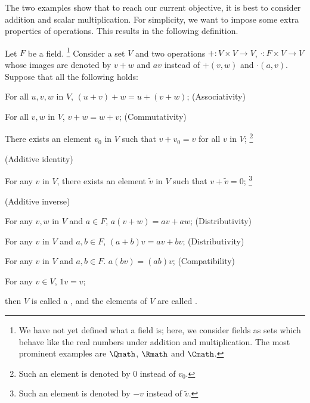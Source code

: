 The two examples show that
to reach our current objective,
it is best to consider addition and scalar multiplication.
For simplicity, we want to impose some extra properties of operations.
This results in the following definition.

\begin{definition}
    \label{def:vectorspace}
    Let \(F\) be a field.%
    \footnote{We have not yet defined what a field is;
    here, we consider fields as sets which behave like the real numbers
    under addition and multiplication.
    The most prominent examples are
    \(\Qmath\), \(\Rmath\) and \(\Cmath\).}
    Consider a set \(V\) and two operations
    \(+:V\times V\to V\), \(\cdot:F\times V\to V\)
    whose images are denoted by \(v+w\) and \(av\)
    instead of \(+(v,w)\) and \(\cdot(a,v)\).
    Suppose that all the following holds:
    \begin{axioms}[Vsp]
        \item For all \(u,v,w\) in \(V\), \((u+v)+w=u+(v+w)\);
        \hfill\textsf{(Associativity)}

        \item For all \(v,w\) in \(V\), \(v+w=w+v\);
        \hfill\textsf{(Commutativity)}

        \item There exists an element \(v_0\) in \(V\) such that
        \(v+v_0=v\) for all \(v\) in \(V\);%
        \footnote{
            Such an element is denoted by \(0\)
            instead of \(v_0\).}

        \hfill\textsf{(Additive identity)}

        \item For any \(v\) in \(V\),
        there exists an element \(\tilde v\) in \(V\) such that
        \(v+\tilde v=0\);%
        \footnote{
            Such an element is denoted by \(-v\)
            instead of \(\tilde v\).}

        \hfill\textsf{(Additive inverse)}

        \item For any \(v,w\) in \(V\) and \(a\in F\),
        \(a(v+w)=av+aw\);
        \hfill\textsf{(Distributivity)}

        \item For any \(v\) in \(V\) and \(a,b\in F\),
        \((a+b)v=av+bv\);
        \hfill\textsf{(Distributivity)}

        \item For any \(v\) in \(V\) and \(a,b\in F\).
        \(a(bv)=(ab)v\);
        \hfill\textsf{(Compatibility)}

        \item For any \(v\in V\), \(1v=v\);
    \end{axioms}
    then \(V\) is called
    a ,
    and the elements of \(V\) are called
    .
\end{definition}

